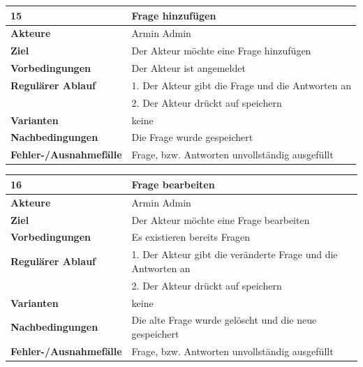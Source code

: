\documentclass[fontsize=12pt,paper=a4,twoside]{scrartcl}
\begin{document}
\begin{table}
	[H] \label{15} 
	\begin{tabular}
		{|l|p{10cm}|} \hline \textbf{15} & \textbf{Frage hinzufügen} \\
		\hline \textbf{Akteure} & Armin Admin\\
		\hline \textbf{Ziel} & Der Akteur möchte eine Frage hinzufügen\\
		\hline \textbf{Vorbedingungen} & Der Akteur ist angemeldet\\
		\hline \textbf{Regulärer Ablauf} & 1. Der Akteur gibt die Frage und die Antworten an\\
		&2. Der Akteur drückt auf speichern\\
		\hline \textbf{Varianten} & keine \\
		\hline \textbf{Nachbedingungen} & Die Frage wurde gespeichert\\
		\hline \textbf{Fehler-/Ausnahmefälle} & Frage, bzw. Antworten unvollständig ausgefüllt \\
		\hline 
	\end{tabular}
\end{table}

\begin{table}
	[H] \label{16} 
	\begin{tabular}
		{|l|p{10cm}|} \hline \textbf{16} & \textbf{Frage bearbeiten} \\
		\hline \textbf{Akteure} & Armin Admin\\
		\hline \textbf{Ziel} & Der Akteur möchte eine Frage bearbeiten\\
		\hline \textbf{Vorbedingungen} & Es existieren bereits Fragen\\
		\hline \textbf{Regulärer Ablauf} & 1. Der Akteur gibt die veränderte Frage und die Antworten an\\
		&2. Der Akteur drückt auf speichern\\
		\hline \textbf{Varianten} & keine \\
		\hline \textbf{Nachbedingungen} & Die alte Frage wurde gelöscht und die neue gespeichert\\
		\hline \textbf{Fehler-/Ausnahmefälle} & Frage, bzw. Antworten unvollständig ausgefüllt \\
		\hline 
	\end{tabular}
\end{table}
\end{document}
